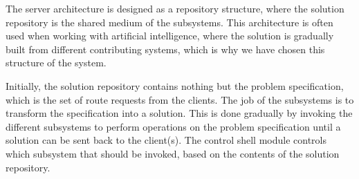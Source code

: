 The server architecture is designed as a repository structure, where the solution repository is the shared medium of the subsystems. This architecture is often used when working with artificial intelligence, where the solution is gradually built from different contributing systems, which is why we have chosen this structure of the system.

Initially, the solution repository contains nothing but the problem specification, which is the set of route requests from the clients. The job of the subsystems is to transform the specification into a solution. This is done gradually by invoking the different subsystems to perform operations on the problem specification until a solution can be sent back to the client(s). The control shell module controls which subsystem that should be invoked, based on the contents of the solution repository. 

